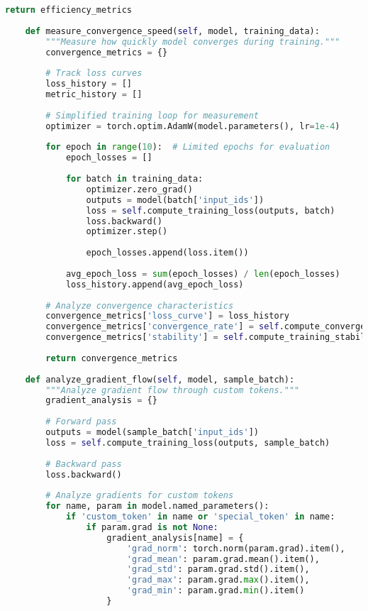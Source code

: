 \begin{lstlisting}[language=Python, caption=Comprehensive evaluation framework for custom tokens]
        return efficiency_metrics
    
    def measure_convergence_speed(self, model, training_data):
        """Measure how quickly model converges during training."""
        convergence_metrics = {}
        
        # Track loss curves
        loss_history = []
        metric_history = []
        
        # Simplified training loop for measurement
        optimizer = torch.optim.AdamW(model.parameters(), lr=1e-4)
        
        for epoch in range(10):  # Limited epochs for evaluation
            epoch_losses = []
            
            for batch in training_data:
                optimizer.zero_grad()
                outputs = model(batch['input_ids'])
                loss = self.compute_training_loss(outputs, batch)
                loss.backward()
                optimizer.step()
                
                epoch_losses.append(loss.item())
            
            avg_epoch_loss = sum(epoch_losses) / len(epoch_losses)
            loss_history.append(avg_epoch_loss)
        
        # Analyze convergence characteristics
        convergence_metrics['loss_curve'] = loss_history
        convergence_metrics['convergence_rate'] = self.compute_convergence_rate(loss_history)
        convergence_metrics['stability'] = self.compute_training_stability(loss_history)
        
        return convergence_metrics
    
    def analyze_gradient_flow(self, model, sample_batch):
        """Analyze gradient flow through custom tokens."""
        gradient_analysis = {}
        
        # Forward pass
        outputs = model(sample_batch['input_ids'])
        loss = self.compute_training_loss(outputs, sample_batch)
        
        # Backward pass
        loss.backward()
        
        # Analyze gradients for custom tokens
        for name, param in model.named_parameters():
            if 'custom_token' in name or 'special_token' in name:
                if param.grad is not None:
                    gradient_analysis[name] = {
                        'grad_norm': torch.norm(param.grad).item(),
                        'grad_mean': param.grad.mean().item(),
                        'grad_std': param.grad.std().item(),
                        'grad_max': param.grad.max().item(),
                        'grad_min': param.grad.min().item()
                    }
        

\end{lstlisting}
